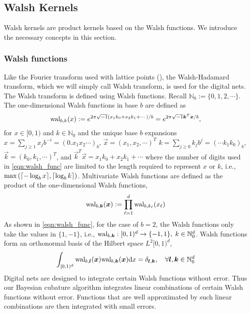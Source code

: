 \documentclass{svjour3}                     %
\newcommand{\bm}[1]{\boldsymbol{#1}}
\newcommand{\dif}[1]{\text{d}{#1}}
\newcommand{\naturals}{\mathbb{N}}
\newcommand{\vk}{\bm{k}}
\newcommand{\vl}{\bm{l}}
\newcommand{\vx}{\bm{x}}
\newcommand{\dx}{\dif{{x}}}
\DeclarePairedDelimiter{\ceil}{\lceil}{\rceil}
\begin{document}
\subsection{Walsh Kernels}

Walsh kernels are product kernels based on the Walsh functions. We introduce the necessary concepts in this section.

\subsubsection{Walsh functions}
Like the Fourier transform used with lattice points (\cite{JagHic19a}), the Walsh-Hadamard transform, which we will simply call Walsh transform, is used for the digital nets. The Walsh transform is defined using Walsh functions. Recall $\naturals_0 := \lbrace 0,1,2,\cdots \rbrace$.
The one-dimensional Walsh functions in base $b$ are defined as
\begin{align}
\label{eqn:walsh_func}
\textup{wal}_{b,k}(x) := e^{2\pi \sqrt{-1} (x_1 k_0 + x_2 k_1 + \cdots)/b} 
=
e^{2\pi \sqrt{-1} {\vec{k}}^T{\vec{x}}/b},
\end{align}
for $x \in [0,1)$ and $k \in \naturals_0$ and the unique base $b$ expansions 
$x = \sum_{j \ge 1} x_j b^{-i} = (0.x_1 x_2 \cdots)_b$, $\vec{x} =  (x_1,x_2,\cdots )^T$
$k = \sum_{j \ge 0} k_j b^{j} = ( \cdots k_1 k_0)_b$, $\vec{k} =  (k_0,k_1,\cdots )^T$, and ${\vec{k}}^T{\vec{x}} = x_1 k_0 + x_2 k_1 + \cdots$
where the number of digits used in \eqref{eqn:walsh_func} are limited to the length required to represent $x$ or $k$, i.e., $\max \left( {\ceil{ -\log_b{x}}, \ceil{\log_b{k}}  } \right)$.
Multivariate Walsh functions are defined as the product of the one-dimensional Walsh functions,
\begin{align*}
\textup{wal}_{b,\vk} (\vx) := \prod_{\ell=1}^d \textup{wal}_{b,k_\ell} (x_\ell
)
\end{align*}
As shown in \eqref{eqn:walsh_func}, for the case of $b=2$, the Walsh functions only take the values in $\{1, -1\}$, i.e., $\textup{wal}_{b,\vk} : [0,1)^d \to {\{-1, 1\}} , \; k \in \naturals_0^d$. Walsh functions form an orthonormal basis of the Hilbert space $L^2[0,1)^d$,
\begin{align*}
\int_{[0,1)^d}
\textup{wal}_{b,\vl} (\vx) \textup{wal}_{b,\vk}(\vx) \dx = \delta_{\vl, \vk}, \quad \forall \vl, \vk \in \naturals_0^d
\end{align*}
Digital nets are designed to integrate certain Walsh functions without error.
Thus our Bayesian cubature algorithm integrates linear combinations of %
certain Walsh functions without error. Functions that are well approximated by such linear combinations are then integrated with small errors.
\end{document}
